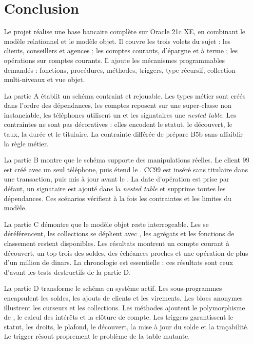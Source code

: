 \chapter{Conclusion}
\label{chap:conclusion}

Le projet réalise une base bancaire complète sur Oracle 21c XE, en combinant
le modèle relationnel et le modèle objet. Il couvre les trois volets du sujet :
les clients, conseillers et agences ; les comptes courants, d'épargne et à
terme ; les opérations sur comptes courants. Il ajoute les mécanismes
programmables demandés : fonctions, procédures, méthodes, triggers, type
récursif, collection multi-niveaux et vue objet.

La partie A établit un schéma contraint et rejouable. Les types métier sont
créés dans l'ordre des dépendances, les comptes reposent sur une super-classe
non instanciable, les téléphones utilisent un  et les signataires
une \emph{nested table}. Les contraintes ne sont pas décoratives : elles
encodent le statut, le découvert, le taux, la durée et le titulaire. La
contrainte différée de  prépare B5b sans affaiblir la règle
métier.

La partie B montre que le schéma supporte des manipulations réelles. Le client
99 est créé avec un seul téléphone, puis  étend le
. CC99 est inséré sans titulaire dans une transaction, puis mis à
jour avant le . La date d'opération est prise par défaut, un
signataire est ajouté dans la \emph{nested table} et 
supprime toutes les dépendances. Ces scénarios vérifient à la fois les
contraintes et les limites du modèle.

La partie C démontre que le modèle objet reste interrogeable. Les  se
déréférencent, les collections se déplient avec , les
agrégats et les fonctions de classement restent disponibles. Les résultats
montrent un compte courant à découvert, un top trois des soldes, des échéances
proches et une opération de plus d'un million de dinars. La chronologie est
essentielle : ces résultats sont ceux d'avant les tests destructifs de la
partie D.

La partie D transforme le schéma en système actif. Les sous-programmes
encapsulent les soldes, les ajouts de clients et les virements. Les blocs
anonymes illustrent les curseurs et les collections. Les méthodes ajoutent le
polymorphisme de , le calcul des intérêts et la clôture de
compte. Les triggers garantissent le statut, les droits, le plafond, le
découvert, la mise à jour du solde et la traçabilité. Le trigger
 résout proprement le problème de la table mutante.

